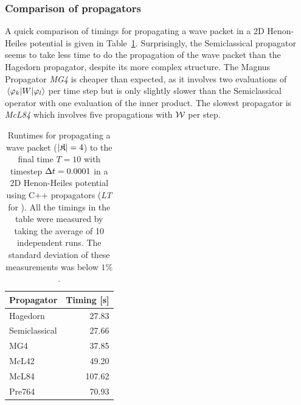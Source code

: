 \subsubsection{Comparison of propagators}
%
A quick comparison of timings for propagating a wave packet in a 2D Henon-Heiles potential is given in Table~\ref{tab:speedup}.
Surprisingly, the Semiclassical propagator seems to take less time to do the propagation of the wave packet than the Hagedorn propagator, despite its more complex structure.
The Magnus Propagator \emph{MG4} is cheaper than expected, as it involves two evaluations of $\matrixel{\varphi_k}{W}{\varphi_l}$ per time step but is only slightly slower than the Semiclassical operator with one evaluation of the inner product.
The slowest propagator is \emph{McL84} which involves five propagations with $\mathcal{W}$ per step.
%
\begin{table}[ht]
	\centering
	\begin{tabular}{|l | r |} 
		\hline
		\multicolumn{1}{|c}{\textbf{Propagator}} &
		\multicolumn{1}{|c|}{\textbf{Timing [s]}} \\
		\hline
		Hagedorn & 27.83 \\
		Semiclassical & 27.66 \\
		MG4 & 37.85 \\
		McL42 & 49.20 \\
		McL84 & 107.62 \\
		Pre764 & 70.93 \\
		\hline
	\end{tabular}
	\caption{Runtimes for propagating a wave packet ($| \mathfrak{K} | = 4$) to the final time $T = 10$ with timestep $\Delta t = 0.0001$ in a 2D Henon-Heiles potential using C++ propagators (\emph{LT} for ). All the timings in the table were measured by taking the average of 10 independent runs. The standard deviation of these measurements was below $1\%$.}
	\label{tab:speedup}
\end{table}


